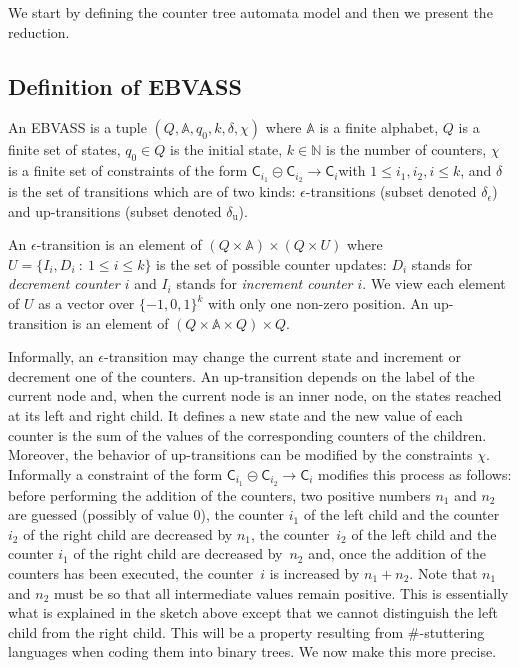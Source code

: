 \documentclass{CSML}
\newcommand\ebvass{\textup{EBVASS}\xspace}
\newcommand\A{\ensuremath{\mathbb{A}}\xspace}
\newcommand\N{\ensuremath{\mathbb{N}}\xspace}
\newcommand\merc[3]{\mathsf{C}_{#1}\mathpunct{\circleddash}\mathsf{C}_{#2}\to\mathsf{C}_{#3}}
\newcommand\set[1]{\ensuremath{\{#1\}}}
\begin{document}
We start by defining the counter tree automata model and then we present
the reduction.

\subsection{Definition of \ebvass} 


An \ebvass is a tuple $(Q,\A,q_0,k,\delta,\chi)$ 
where \A is a finite alphabet, $Q$ is a finite set of states, $q_0 \in Q$ is the initial
state, $k\in\N$ is the number of counters, $\chi$ is a finite set of constraints of
the form $\merc{i_1}{i_2}{i} $with $1\leq i_1,i_2,i\leq k$, and $\delta$ is the set of transitions which are
of two kinds: $\epsilon$-transitions (subset denoted $\delta_\epsilon$) and
up-transitions (subset denoted $\delta_\text{u}$).

An $\epsilon$-transition is an element of $(Q\times\A) \times (Q\times U)$
where $U=\set{I_i,D_i~:~1\leq i \leq k}$ is the set of possible counter
updates: $D_i$ stands for \emph{decrement counter $i$} and $I_i$ stands for
\emph{increment counter $i$}. We view each element of $U$ as a vector over
$\set{-1,0,1}^k$ with only one non-zero position.
An up-transition is an element of $(Q\times\A\times Q) \times Q$.


Informally, an $\epsilon$-transition may change the current state and increment
or decrement one of the counters. An up-transition depends on the label of the
current node and, when the current node is an inner node, on the states reached
at its left and right child.  It defines a new state and the new value of each
counter is the sum of the values of the corresponding counters of the children.
Moreover, the behavior of up-transitions can be modified by the constraints
$\chi$. Informally a constraint of the form $\merc{i_1}{i_2}{i}$ modifies this
process as follows: before performing the addition of the counters, 
two positive numbers
$n_1$ and $n_2$ are guessed 
(possibly of value $0$), the counter $i_1$ of the left child and the counter
$i_2$ of the right child are decreased by $n_1$, the counter~$i_2$ of the left
child and the counter $i_1$ of the right child are decreased by~$n_2$ and, once
the addition of the counters has been executed, the counter~$i$ is increased by
$n_1 + n_2$. Note that $n_1$ and $n_2$ must be so that all intermediate values
remain positive.  This is essentially what is explained in the sketch above
except that we cannot distinguish the left child from the right child. This
will be a property resulting from $\#$-stuttering languages when coding them into binary
trees.
We now make this more precise.
\end{document}
